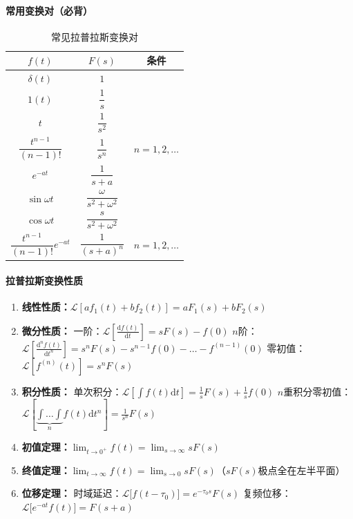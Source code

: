 \paragraph{常用变换对（必背）}
\begin{table}[htbp]
\centering
\caption{常见拉普拉斯变换对}
\begin{tabular}{ccc}
\toprule
$f(t)$ & $F(s)$ & 条件 \\
\midrule
$\delta(t)$ & $1$ & \\
$1(t)$ & $\dfrac1s$ & \\
$t$ & $\dfrac1{s^2}$ & \\
$\dfrac{t^{n-1}}{(n-1)!}$ & $\dfrac1{s^n}$ & $n=1,2,\dots$ \\
$e^{-at}$ & $\dfrac1{s+a}$ & \\
$\sin\omega t$ & $\dfrac{\omega}{s^2+\omega^2}$ & \\
$\cos\omega t$ & $\dfrac{s}{s^2+\omega^2}$ & \\
$\dfrac{t^{n-1}}{(n-1)!}e^{-at}$ & $\dfrac1{(s+a)^n}$ & $n=1,2,\dots$ \\
\bottomrule
\end{tabular}
\end{table}

\paragraph{拉普拉斯变换性质}
\begin{enumerate}
\item \textbf{线性性质：}$\mathcal{L}[a f_1(t)+b f_2(t)]=aF_1(s)+bF_2(s)$

\item \textbf{微分性质：}
一阶：$\displaystyle \mathcal{L}\left[\frac{\mathrm{d}f(t)}{\mathrm{d}t}\right]=sF(s)-f(0)$
$n$阶：$\displaystyle \mathcal{L}\left[\frac{\mathrm{d}^n f(t)}{\mathrm{d}t^n}\right]=s^nF(s)-s^{n-1}f(0)-\dots-f^{(n-1)}(0)$
零初值：$\mathcal{L}[f^{(n)}(t)]=s^nF(s)$

\item \textbf{积分性质：}
单次积分：$\displaystyle \mathcal{L}\left[\int f(t)\mathrm{d}t\right]=\frac1sF(s)+\frac1s f(0)$
$n$重积分零初值：$\displaystyle \mathcal{L}\left[\underbrace{\int\dots\int}_{n} f(t)\mathrm{d}t^n\right]=\frac1{s^n}F(s)$

\item \textbf{初值定理：}$\displaystyle \lim_{t\to0^+}f(t)=\lim_{s\to\infty}sF(s)$

\item \textbf{终值定理：}$\displaystyle \lim_{t\to\infty}f(t)=\lim_{s\to0}sF(s)$（$sF(s)$极点全在左半平面）

\item \textbf{位移定理：}
时域延迟：$\mathcal{L}\big[f(t-\tau_0)\big]=e^{-\tau_0 s}F(s)$
复频位移：$\mathcal{L}\big[e^{-at}f(t)\big]=F(s+a)$
\end{enumerate}

